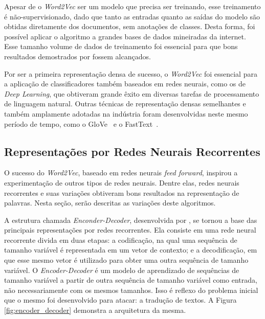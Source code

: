 Apesar de o \textit{Word2Vec} ser um modelo que precisa ser treinando, esse
treinamento é não-supervisionado, dado que tanto as entradas quanto as saídas do
modelo são obtidas diretamente dos documentos, sem anotações de classes.
Desta forma, foi possível aplicar o algoritmo a grandes bases de dados
mineiradas da internet.
Esse tamanho volume de dados de treinamento foi essencial para que bons resultados
demostrados por \citet{mikolov13} fossem alcançados.

Por ser a primeira representação densa de sucesso, o \textit{Word2Vec} foi
essencial para a aplicação de classificadores também baseados em redes neurais,
como os de \textit{Deep Learning}, que obtiveram grande êxito em diversas
tarefas de processamento de linguagem natural.
Outras técnicas de representação densas semelhantes e também amplamente adotadas
na indústria foram desenvolvidas neste mesmo período de tempo, como o
GloVe~\cite{pennington14} e o FastText~\cite{bojanowski17}.


\subsection{Representações por Redes Neurais Recorrentes}
\label{representation:rnn}

O sucesso do \textit{Word2Vec}, baseado em redes neurais \textit{feed forward},
inspirou a experimentação de outros tipos de redes neurais.
Dentre elas, redes neurais recorrentes e suas variações obtiveram bons resultados
na representação de palavras.
Nesta seção, serão descritas as variações deste algoritmos.

A estrutura chamada \textit{Enconder-Decoder}, desenvolvida por \citet{cho14},
se tornou a base das principais representações por redes recorrentes.
Ela consiste em uma rede neural recorrente divida em duas etapas: a codificação,
na qual uma sequência de tamanho variável é representada em um
vetor de contexto; e a decodificação, em que esse mesmo vetor é utilizado para
obter uma outra sequência de tamanho variável.
O \textit{Encoder-Decoder} é um modelo de aprendizado de sequências de tamanho
variável a partir de outra sequência de tamanho variável como entrada, não
necessariamente com os mesmos tamanhos.
Isso é reflexo do problema inicial que o mesmo foi desenvolvido para atacar: a
tradução de textos.
A Figura \ref{fig:encoder_decoder} demonstra a arquitetura da mesma.

